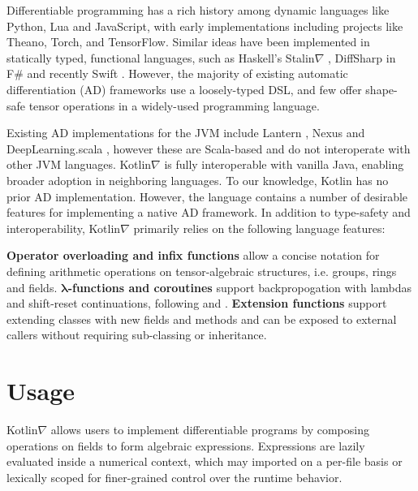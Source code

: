 \documentclass[12pt,initial,twoside,maitrise]{dms}
\numberwithin{equation}{section}
\numberwithin{table}{chapter}
\numberwithin{figure}{chapter}
\begin{document}
Differentiable programming has a rich history among dynamic languages like Python, Lua and JavaScript, with early implementations including projects like Theano, Torch, and TensorFlow. Similar ideas have been implemented in statically typed, functional languages, such as Haskell's Stalin$\nabla$ \cite{pearlmutter2008using}, DiffSharp in F\# \cite{baydin-diffsharp} and recently Swift \cite{swift}. However, the majority of existing automatic differentiation (AD) frameworks use a loosely-typed DSL, and few offer shape-safe tensor operations in a widely-used programming language.

Existing AD implementations for the JVM include Lantern \cite{DBLP:journals-corr-abs-1803-10228}, Nexus \cite{chen2017typesafe} and DeepLearning.scala \cite{dl4s}, however these are Scala-based and do not interoperate with other JVM languages. Kotlin$\nabla$ is fully interoperable with vanilla Java, enabling broader adoption in neighboring languages. To our knowledge, Kotlin has no prior AD implementation. However, the language contains a number of desirable features for implementing a native AD framework. In addition to type-safety and interoperability, Kotlin$\nabla$ primarily relies on the following language features:

\textbf{Operator overloading and infix functions} allow a concise notation for defining arithmetic operations on tensor-algebraic structures, i.e. groups, rings and fields.
\textbf{$\mathbf{\lambda}$-functions and coroutines} support backpropogation with lambdas and shift-reset continuations, following \cite{pearlmutter2008reverse} and \cite{DBLP:journals-corr-abs-1803-10228}.
\textbf{Extension functions} support extending classes with new fields and methods and can be exposed to external callers without requiring sub-classing or inheritance.

\section{Usage}

Kotlin$\nabla$ allows users to implement differentiable programs by composing operations on fields to form algebraic expressions. Expressions are lazily evaluated inside a numerical context, which may imported on a per-file basis or lexically scoped for finer-grained control over the runtime behavior.
\end{document}
